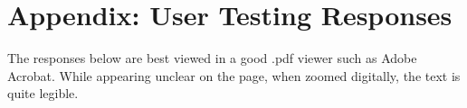 \section{Appendix: User Testing Responses}\label{sec:appendix:-user-testing-responses}
The responses below are best viewed in a good .pdf viewer such as Adobe Acrobat.
While appearing unclear on the page, when zoomed digitally, the text is quite legible.

